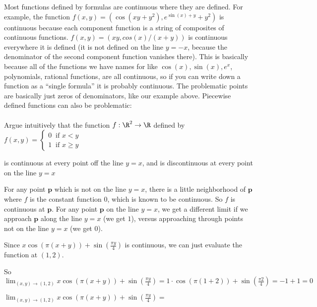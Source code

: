 \documentclass{ximera}
\begin{document}
	Most functions defined by formulas are continuous where they are defined.  For example, the function
	$f(x,y) = (\cos(xy+y^2),e^{\sin(x)+y}+y^2)$ is continuous because each component function is a string of composites of continuous functions. 
	$f(x,y) = (xy,cos(x)/(x+y))$ is continuous everywhere it is defined (it is not defined on the line $y=-x$, because the denominator of the 
	second component function vanishes there).  This is basically because all of the functions we have names for like $\cos(x),\sin(x), e^x$, polynomials, 
	rational functions, are all continuous, so if you can write down a function as a ``single formula'' it is probably continuous. 
	The problematic points are basically just zeros of denominators, like our example above.  Piecewise defined functions can also be problematic:
	\\
	\\
		Argue intuitively that the function $f:\R^2 \to \R$ defined by 
			\(f(x,y) = \begin{cases}
			0 \  \text{ if $x<y$}\\
			1 \  \text{ if $x\geq y$}
			\end{cases}\)
			
			is continuous at every point off the line $y=x$, and is discontinuous at every point on the line $y=x$
\begin{free-response}
	For any point $\mathbf{p}$ which is not on the line $y=x$, there is a little neighborhood of $\mathbf{p}$ where $f$ is the constant function $0$,
	 which is known to be  continuous.  So $f$ is continuous at $\mathbf{p}$.  For any point $\mathbf{p}$ on the line $y=x$, we get a different limit if we approach 
	 $\mathbf{p}$ along the line $y=x$ (we get $1$), versus approaching through points not on the line $y=x$ (we get $0$).
\end{free-response}
	
	\begin{question}
		\begin{solution}
		\begin{hint}
			Since $x\cos(\pi (x+y)) + \sin(\frac{\pi y}{4})$ is continuous, we can just evaluate the function at $(1,2)$.
		\end{hint}
		\begin{hint}
			So $\displaystyle\lim_{(x,y) \to (1,2)} x\cos(\pi (x+y)) + \sin(\frac{\pi y}{4}) = 1 \cdot \cos(\pi(1+2))+\sin(\frac{\pi 2}{4}) = -1+1=0$
		\end{hint}
		$\lim_{(x,y) \to (1,2)} x\cos(\pi (x+y)) + \sin(\frac{\pi y}{4}) =$ 
		\end{solution}
	\end{question}
	
\end{document}
